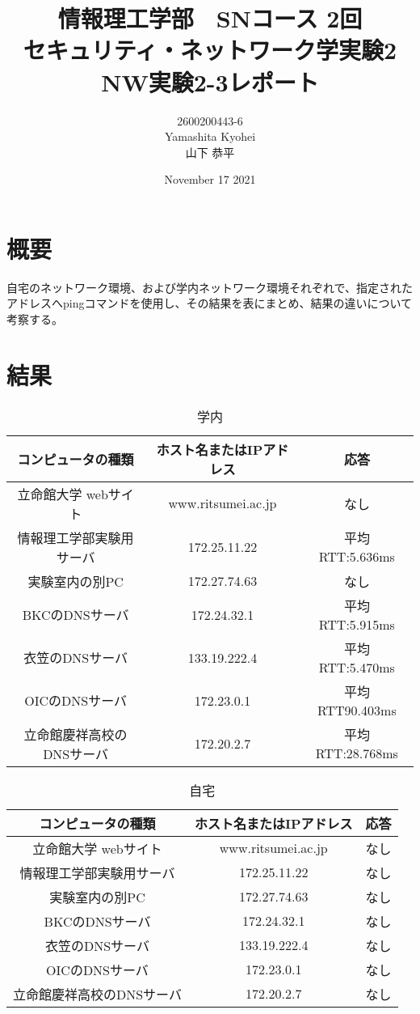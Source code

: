 \documentclass[dvipdfmx,autodetect-engine,titlepage]{jsarticle}
\title{情報理工学部　SNコース 2回\\
セキュリティ・ネットワーク学実験2\\
NW実験2-3レポート}
\author{2600200443-6\\Yamashita Kyohei\\山下 恭平}
\date{November 17 2021}
\begin{document}
\maketitle

\section{概要}
自宅のネットワーク環境、および学内ネットワーク環境それぞれで、指定された
アドレスへpingコマンドを使用し、その結果を表にまとめ、結果の違いについて
考察する。

\section{結果}

\begin{table}[h]
  \centering
  \caption{学内}
  \begin{tabular}{|c|c|c|}
  \hline
  コンピュータの種類       & ホスト名またはIPアドレス      & 応答             \\ \hline
  立命館大学 webサイト    & www.ritsumei.ac.jp & なし             \\ \hline
  情報理工学部実験用サーバ   & 172.25.11.22       & 平均RTT:5.636ms  \\ \hline
  実験室内の別PC        & 172.27.74.63       & なし             \\ \hline
  BKCのDNSサーバ     & 172.24.32.1        & 平均RTT:5.915ms  \\ \hline
  衣笠のDNSサーバ       & 133.19.222.4       & 平均RTT:5.470ms  \\ \hline
  OICのDNSサーバ      & 172.23.0.1         & 平均RTT90.403ms  \\ \hline
  立命館慶祥高校のDNSサーバ & 172.20.2.7         & 平均RTT:28.768ms \\ \hline
  \end{tabular}
  \end{table}

  \begin{table}[h]
    \centering
    \caption{自宅}
    \begin{tabular}{|c|c|c|}
    \hline
    コンピュータの種類       & ホスト名またはIPアドレス      & 応答             \\ \hline
    立命館大学 webサイト    & www.ritsumei.ac.jp & なし             \\ \hline
    情報理工学部実験用サーバ   & 172.25.11.22       & なし  \\ \hline
    実験室内の別PC        & 172.27.74.63       & なし             \\ \hline
    BKCのDNSサーバ     & 172.24.32.1        & なし  \\ \hline
    衣笠のDNSサーバ       & 133.19.222.4       & なし  \\ \hline
    OICのDNSサーバ      & 172.23.0.1         & なし  \\ \hline
    立命館慶祥高校のDNSサーバ & 172.20.2.7         & なし \\ \hline
    \end{tabular}
    \end{table}
\end{document}
